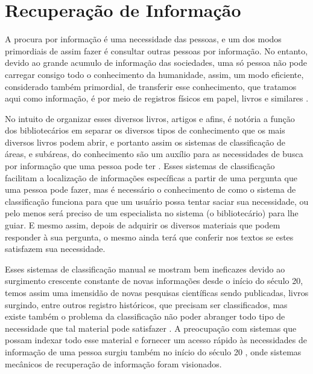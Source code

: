\section{Recuperação de Informação} \label{sec:RecuperaçãoInformação}




A procura por informação é uma necessidade das pessoas, e um dos modos primordiais de assim fazer é consultar outras pessoas por informação.
No entanto, devido ao grande acumulo de informação das sociedades, uma só pessoa não pode carregar consigo todo o conhecimento da humanidade, assim, um modo eficiente, considerado também primordial, de transferir esse conhecimento, que tratamos aqui como informação, é por meio de registros físicos em papel, livros e similares \cite[p.~1]{Grossman2004IRAH}.

No intuito de organizar esses diversos livros, artigos e afins, é notória a função dos bibliotecários em separar os diversos tipos de conhecimento que os mais diversos livros podem abrir, e portanto assim os sistemas de classificação de áreas, e subáreas, do conhecimento são um auxílio para as necessidades de busca por informação que uma pessoa pode ter \cite[p.~1]{Manning2008IIR}\cite[p.~1446]{Sanderson2012THIRR}. 
Esses sistemas de classificação facilitam a localização de informações específicas a partir de uma pergunta que uma pessoa pode fazer, mas é necessário o conhecimento de como o sistema de classificação funciona para que um usuário possa tentar saciar sua necessidade, ou pelo menos será preciso de um especialista no sistema (o bibliotecário) para lhe guiar.
E mesmo assim, depois de adquirir os diversos materiais que podem responder à sua pergunta, o mesmo ainda terá que conferir nos textos se estes satisfazem sua necessidade.


Esses sistemas de classificação manual se mostram bem ineficazes devido ao surgimento crescente constante de novas informações desde o início do século 20, temos assim uma imensidão de novas pesquisas científicas sendo publicadas, livros surgindo, entre outros registro históricos, que precisam ser classificados, mas existe também o problema da classificação não poder abranger todo tipo de necessidade que tal material pode satisfazer \cite[p.~1444]{Sanderson2012THIRR}. 
A preocupação com sistemas que possam indexar todo esse material e fornecer um acesso rápido às necessidades de informação de uma pessoa surgiu também no início do século 20 \cite{Bush:1979:WMT:1113634.1113638}, onde sistemas mecânicos de recuperação de informação foram visionados.


